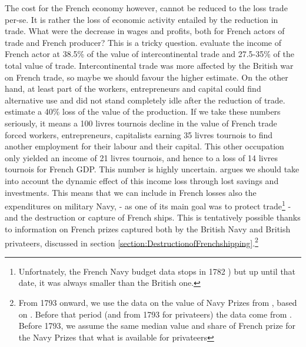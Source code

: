 \documentclass[12pt,a4paper,notitlepage,english]{article}
\begin{document}
The cost for the French economy however, cannot be reduced to the loss trade per-se. It is rather the loss of economic activity entailed by the reduction in trade. What were the decrease in wages and profits, both for French actors of trade and French producer? This is a tricky question. \cite[p. 408]{Daudin2005} evaluate the income of French actor at 38.5\% of the value of intercontinental trade and 27.5-35\% of the total value of trade.
Intercontinental trade was more affected by the British war on French trade, so maybe we should favour the higher estimate. On the other hand, at least part of the workers, entrepreneurs and capital could find alternative use and did not stand completely idle after the reduction of trade. 
\cite[p. 421]{Daudin2005} estimate a 40\% loss of the value of the production. If we take these numbers seriously, it means a 100 livres tournois decline in the value of French trade forced workers, entrepreneurs, capitalists earning 35 livres tournois to find another employment for their labour and their capital. This other occupation only yielded an income of 21 livres tournois, and hence to a loss of 14 livres tournois for French GDP. 
This number is highly uncertain. \cite{Daudin2005} argues we should take into account the dynamic effect of this income loss through lost savings and investments. 
This means that we can include in French losses also the expenditures on military Navy, - as one of its main goal was to protect trade\footnote{Unfortnately, the French Navy budget data stops in 1782 \cite{Acerra1997, Villiers1997,Petitfils2015}) but up until that date, it was always smaller than the British one.} - and the destruction or capture of French ships. This is tentatively possible thanks to information on French prizes captured both by the British Navy and British privateers, discussed in section \ref{section:DestructionofFrenchshipping}.\footnote{From 1793 onward, we use the data on the value of Navy Prizes from \cite{Benjamin2009}, based on \cite{Hill1998}. Before that period (and from 1793 for privateers) the data come from \cite{Starkey1990,Hillmann2011}. Before 1793, we assume the same median value and share of French prize for the Navy Prizes that what is available for privateers }
\end{document}

